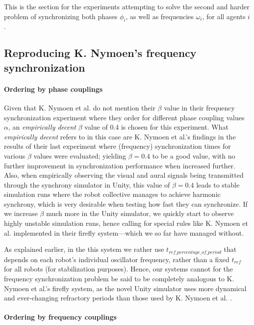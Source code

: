 	This is the section for the experiments attempting to solve the second and harder problem of synchronizing both phases $\phi_i$, as well as frequencies $\omega_i$, for all agents $i$.

	\subsection{Reproducing K. Nymoen's frequency synchronization}
	
	\paragraph{Ordering by phase couplings}
	Given that K. Nymoen et al. \cite{nymoen_synch} do not mention their $\beta$ value in their frequency synchronization experiment where they order for different phase coupling values $\alpha$, an \textit{empirically decent} $\beta$ value of 0.4 is chosen for this experiment. What \textit{empirically decent} refers to in this case are K. Nymoen et al.'s findings in the results of their last experiment where (frequency) synchronization times for various $\beta$ values were evaluated; yielding $\beta=0.4$ to be a good value, with no further improvement in synchronization performance when increased further. Also, when empirically observing the visual and aural signals being transmitted through the synchrony simulator in Unity, this value of $\beta=0.4$ leads to stable simulation runs where the robot collective manages to achieve harmonic synchrony, which is very desirable when testing how fast they can synchronize. If we increase $\beta$ much more in the Unity simulator, we quickly start to observe highly unstable simulation runs, hence calling for special rules like K. Nymoen et al. implemented in their firefly system—which we so far have managed without.
	
	
	As explained earlier, in the this system we rather use $t_{ref\_percentage\_of\_period}$ that depends on each robot's individual oscillator frequency, rather than a fixed $t_{ref}$ for all robots (for stabilization purposes). Hence, our systems cannot for the frequency synchronization problem be said to be completely analogous to K. Nymoen et al.'s firefly system, as the novel Unity simulator uses more dynamical and ever-changing refractory periods than those used by K. Nymoen et al. \cite{nymoen_synch}.
	
	\paragraph{Ordering by frequency couplings}
	
